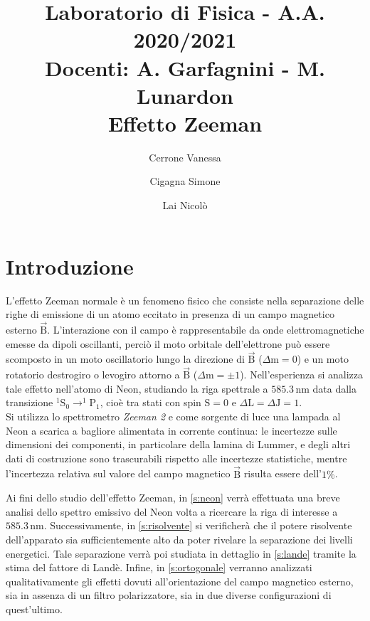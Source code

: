 \documentclass[twocolumn,10pt]{asme2ej}
\date{}
\title{{\huge\bfseries Laboratorio di Fisica} - {\LARGE A.A. 2020/2021} \\ 
    {\LARGE Docenti: A. Garfagnini - M. Lunardon} \\ {\Huge\bfseries Effetto Zeeman}}
\author{Cerrone Vanessa
    \affiliation{
    1200361\\
    vanessa.cerrone@studenti.unipd.it
    }	
}
\author{Cigagna Simone
    \affiliation{
	1193992\\
    simone.cigagna@studenti.unipd.it
    }	
}
\author{Lai Nicolò
    \affiliation{
	1193976\\
    nicolo.lai@studenti.unipd.it
    }	
}
\begin{document}
\maketitle    


\section{Introduzione}\label{s:introduzione}

L'effetto Zeeman normale è un fenomeno fisico che consiste nella separazione delle righe di emissione di un atomo
eccitato in presenza di un campo magnetico esterno $\vec{\text{B}}$. L'interazione con il campo è rappresentabile da
onde elettromagnetiche emesse da dipoli oscillanti, perciò il moto orbitale dell'elettrone può essere scomposto in un
moto oscillatorio lungo la direzione di $\vec{\text{B}}$ ($\Delta \text{m} = 0$) e un moto rotatorio destrogiro o
levogiro attorno a $\vec{\text{B}}$ ($\Delta \text{m} = \pm1$). Nell'esperienza si analizza tale effetto nell'atomo di
Neon, studiando la riga spettrale a $585.3 \,\si{\nano\metre}$ data dalla transizione $^1\text{S}_0 \rightarrow
^1\text{P}_1$, cioè tra stati con spin $\text{S} = 0$ e $\Delta \text{L}= \Delta \text{J} = 1$. \\
Si utilizza lo spettrometro \textit{Zeeman 2} e come sorgente di luce una lampada al Neon a scarica a bagliore
alimentata in corrente continua: le incertezze sulle dimensioni dei componenti, in particolare della lamina di Lummer, e
degli altri dati di costruzione sono trascurabili rispetto alle incertezze statistiche, mentre l'incertezza relativa sul
valore del campo magnetico $\vec{\text{B}}$ risulta essere dell'$1\%$.

Ai fini dello studio dell'effetto Zeeman, in \autoref{s:neon} verrà effettuata una breve analisi dello spettro emissivo
del Neon volta a ricercare la riga di interesse a $585.3 \,\si{\nano\metre}$. Successivamente, in \autoref{s:risolvente}
si verificherà che il potere risolvente dell'apparato sia sufficientemente alto da poter rivelare la separazione dei
livelli energetici. Tale separazione verrà poi studiata in dettaglio in \autoref{s:lande} tramite la stima del fattore
di Landè. Infine, in \autoref{s:ortogonale} verranno analizzati qualitativamente gli effetti dovuti all'orientazione del
campo magnetico esterno, sia in assenza di un filtro polarizzatore, sia in due diverse configurazioni di quest'ultimo.
\end{document}
